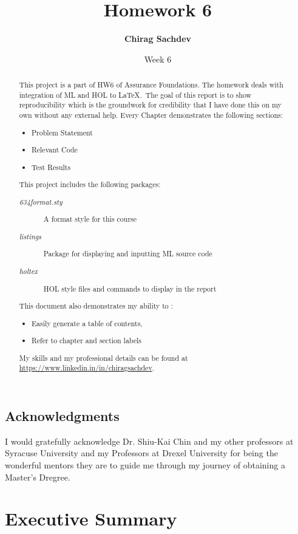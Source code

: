 \documentclass{report}
\title{Homework 6}
\author{\textbf{Chirag Sachdev}}
\date{Week 6}
\begin{document}
\lstset{language=ML}
\maketitle{}

\begin{abstract}
This project is a part of HW6 of Assurance Foundations. The homework deals with integration of ML and HOL to \LaTeX.\ The goal of this report is to show reproducibility which is the groundwork for credibility that I have done this on my own without any external help. Every Chapter demonstrates the following sections:
	\begin{itemize}
		\item Problem Statement
		\item Relevant Code
		\item Test Results
	\end{itemize}
	
This project includes the following packages:
	\begin{description}
		\item[\emph{634format.sty}] A format style for this course
		\item[\emph{listings}] Package for displaying and inputting ML source code
		\item[\emph{holtex}] HOL style files and commands to display in the report
	\end{description}

This document also demonstrates my ability to :
	\begin{itemize}
		\item Easily generate a table of contents,
		\item Refer to chapter and section labels
	\end{itemize}

My skills and my professional details can be found at \url{https://www.linkedin.in/in/chiragsachdev}.
\end{abstract}

\section*{Acknowledgments}
I would gratefully acknowledge Dr. Shiu-Kai Chin and my other professors at Syracuse University and my Professors at Drexel University for being the wonderful mentors they are to guide me through my journey of obtaining a Master's Dregree.

\tableofcontents{}

\chapter{Executive Summary}
\label{cha:executive-summary}
\end{document}
